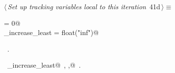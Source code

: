 \documentclass[11.5pt]{report}
\begin{document}
\begin{flushleft} \small\label{scrap61}\raggedright\small
{} $\langle\,${\itshape Set up tracking variables local to this iteration}\nobreak\ {\footnotesize {41d}}$\,\rangle\equiv$
\vspace{-1ex}
\begin{list}{}{} \item
\mbox{}\verb@ibest                = 0@\\
\mbox{}\verb@delta_increase_least = float("inf")@\\
\mbox{}\verb@@{\NWsep}
\end{list}
\vspace{-1.5ex}
\footnotesize
\begin{list}{}{\setlength{\itemsep}{-\parsep}\setlength{\itemindent}{-\leftmargin}}
\item \NWtxtMacroRefIn\ .
\item \NWtxtIdentsDefed\nobreak\  \verb@delta_increase_least@\nobreak\ , \verb@ibest,@\nobreak\ .
\item{}
\end{list}
\vspace{4ex}
\end{flushleft}

\vspace{-0.8cm}\newchunk 
\end{document}
